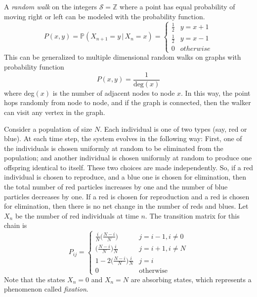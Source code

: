 \documentclass{article}
\begin{document}
    \begin{example}
      A \textit{random walk} on the integers $\mathcal{S} = \mathbb{Z}$ where a point has equal probability of moving right or left can be modeled with the probability function. 
      \begin{equation}
        P(x, y) = \mathbb{P}(X_{n+1} = y \, | \, X_n = x) = \begin{cases}
        \frac{1}{2} & y = x + 1 \\
        \frac{1}{2} & y = x - 1\\
        0 & otherwise
        \end{cases}
      \end{equation}
      This can be generalized to multiple dimensional random walks on graphs with probability function 
      \begin{equation}
        P(x, y) = \frac{1}{\text{deg}(x)}
      \end{equation}
      where deg$(x)$ is the number of adjacent nodes to node $x$. In this way, the point hops randomly from node to node, and if the graph is connected, then the walker can visit any vertex in the graph. 
    \end{example}

    \begin{example}
      Consider a population of size $N$. Each individual is one of two types (say, red or blue). At each time step, the system evolves in the following way: First, one of the individuals is chosen uniformly at random to be eliminated from the population; and another individual is chosen uniformly at random to produce one offspring identical to itself. These two choices are made independently. So, if a red individual is chosen to reproduce, and a blue one is chosen for elimination, then the total number of red particles increases by one and the number of blue particles decreases by one. If a red is chosen for reproduction and a red is chosen for elimination, then there is no net change in the number of reds and blues. Let $X_n$ be the number of red individuals at time $n$. The transition matrix for this chain is
      \begin{equation}
        P_{i j} = \begin{cases}
        \frac{i}{N} \bigg(\frac{N-i}{N} \bigg) & j=i-1, i \neq 0 \\
        \bigg(\frac{N-i}{N} \bigg) \frac{i}{N} & j=i+1, i \neq N \\
        1 - 2 \bigg(\frac{N-i}{N} \bigg) \frac{i}{N} & j = i \\
        0 & \text{otherwise}
        \end{cases}
      \end{equation}
      Note that the states $X_n = 0$ and $X_n = N$ are absorbing states, which represents a phenomenon called \textit{fixation}. 
    \end{example}
\end{document}
